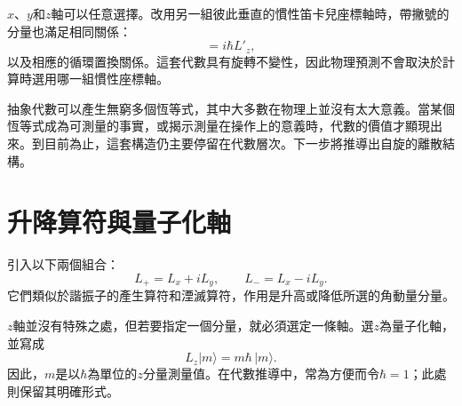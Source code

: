 \(x\)、\(y\)和\(z\)軸可以任意選擇。改用另一組彼此垂直的慣性笛卡兒座標軸時，帶撇號的分量也滿足相同關係：
\begin{equation}
[L'_x,L'_y]=i\hbar L'_z,
\end{equation}
以及相應的循環置換關係。這套代數具有旋轉不變性，因此物理預測不會取決於計算時選用哪一組慣性座標軸。

\begin{classroomqa}
\end{classroomqa}

抽象代數可以產生無窮多個恆等式，其中大多數在物理上並沒有太大意義。當某個恆等式成為可測量的事實，或揭示測量在操作上的意義時，代數的價值才顯現出來。到目前為止，這套構造仍主要停留在代數層次。下一步將推導出自旋的離散結構。

\begin{classroomqa}
\end{classroomqa}

\section{升降算符與量子化軸}

引入以下兩個組合：
\begin{equation}
L_+=L_x+iL_y,
\qquad
L_-=L_x-iL_y.
\end{equation}
它們類似於諧振子的產生算符和湮滅算符，作用是升高或降低所選的角動量分量。

\(z\)軸並沒有特殊之處，但若要指定一個分量，就必須選定一條軸。選\(z\)為量子化軸，並寫成
\begin{equation}
L_z\lvert m\rangle=m\hbar\,\lvert m\rangle.
\end{equation}
因此，\(m\)是以\(\hbar\)為單位的\(z\)分量測量值。在代數推導中，常為方便而令\(\hbar=1\)；此處則保留其明確形式。

